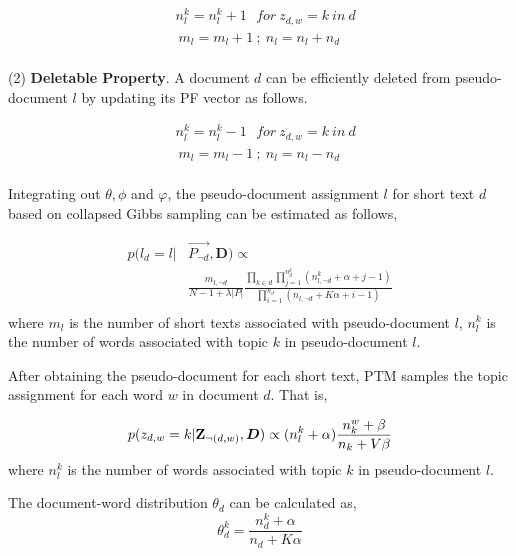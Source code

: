 \documentclass[10pt,journal,compsoc]{IEEEtran}
\begin{document}
{\[
\begin{split}
& n^k_l = n^k_l + 1 \ \ \ for \ z_{d,w}=k \ in \ d \\
&\ m_l = m_l + 1 \ ; \ n_l = n_l + n_d\\
 \end{split}
\]

(2) \textbf{Deletable Property}. A document $d$ can be efficiently deleted from pseudo-document $l$ by updating its PF vector as follows.

\[
\begin{split}
& n^k_l = n^k_l - 1 \ \ \ for \ z_{d,w}=k \ in \ d \\
&\ m_l = m_l - 1 \ ; \ n_l = n_l - n_d\\
 \end{split}
\]

Integrating out $\theta, \phi$ and $\varphi$, the pseudo-document assignment $l$ for short text $d$ based on collapsed Gibbs sampling can be estimated as follows,

\begin{equation} \label{ptm_l}
\begin{split}
 p(l_d = l| & \overrightarrow{P_{\neg{d}}},\bm{D}) \propto \\
 &\frac{m_{l,\neg{d}}}{N-1+\lambda|P|} \frac{\prod_{k\in d}\prod_{j=1}^{n_d^k}(n_{l,\neg{d}}^k+\alpha+j-1)}{\prod_{i=1}^{n_{d}}(n_{{l},\neg{d}}+K\alpha+i-1)}\\
\end{split}
\end{equation}
where $m_l$ is the number of short texts associated with pseudo-document $l$, $n_l^k$ is the number of words associated with topic $k$ in pseudo-document $l$.

After obtaining the pseudo-document for each short text, PTM samples the topic assignment for each word $w$ in document $d$. That is,

\begin{equation} \label{ptm_z}
p(z_{d,w} = k | \textbf{Z}_{\neg(d,w)},\bm{D}) \propto (n_l^k+\alpha) \frac{n_k^{w} + \beta}{n_k + V\beta}\\
\end{equation}
where $n_{l}^k$ is the number of words associated with topic $k$ in pseudo-document $l$. 

The document-word distribution $\theta_d$ can be calculated as,
\begin{equation} \label{ptm_z}
\theta_d^k = \frac{n_{d}^k+\alpha}{n_d+K\alpha}
\end{equation}


}
\end{document}
